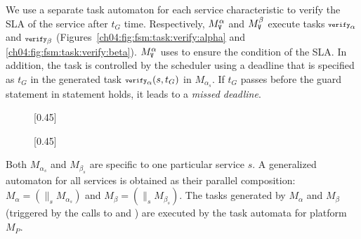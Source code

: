 We use a separate task automaton for each service characteristic to verify the SLA of the service after $t_G$ time.
Respectively, $M^{\alpha}_{{\scriptsize\texttt{V}}}$ and $M^{\beta}_{{\scriptsize\texttt{V}}}$ execute tasks ${\scriptsize\texttt{verify}}_\alpha$ and ${\scriptsize\texttt{verify}}_\beta$ (Figures~\ref{ch04:fig:fsm:task:verify:alpha} and \ref{ch04:fig:fsm:task:verify:beta}).
$M^{\alpha}_{{\scriptsize\texttt{V}}}$ uses  to ensure the condition of the SLA.
In addition, the task is controlled by the scheduler using a deadline that is specified as $t_G$ in the generated task ${\scriptsize\texttt{verify}}_\alpha(s,t_G)$ in $M_{\alpha_s}$. 
If $t_G$ passes before the guard statement in  statement holds, it leads to a \emph{missed deadline}.
\begin{figure}[h]
\captionsetup[subfigure]{font=scriptsize}
\centering
{}[0.45\textwidth]{
}%
[0.45\textwidth]{
%
}
\end{figure}

Both $M_{\alpha_s}$ and $M_{\beta_s}$ are specific to one particular service $s$.
A generalized automaton for all services is obtained as their parallel composition:$M_\alpha = (\parallel_s M_{\alpha_s})$ and $M_\beta = (\parallel_s M_{\beta_s})$.
The tasks generated by $M_\alpha$ and $M_\beta$ (triggered by the calls to
 and ) are executed by the task automata for platform $M_P$.

